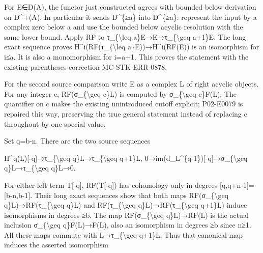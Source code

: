 \documentclass[11pt]{article}
\begin{document}
For E\allowbreak{}∈D(A)\allowbreak{},\allowbreak{} the functor just constructed agrees with bounded below derivation on D\textasciicircum{}\allowbreak{}+(A)\allowbreak{}. In particular it sends D\^{}\{≥a\} into D\textasciicircum{}\{≥a\}:\allowbreak{} represent the input by a complex zero below a and use the bounded below acyclic resolution with the same lower bound. Apply RF to τ\_\allowbreak{}\{\textbackslash{}leq a\}E\allowbreak{}→E\allowbreak{}→τ\_\allowbreak{}\{\textbackslash{}geq a\allowbreak{}+1\}E. The long exact sequence proves H\textasciicircum{}i(RF(τ\_\allowbreak{}\{\textbackslash{}leq a\}E)\allowbreak{})\allowbreak{}\allowbreak{}→H\textasciicircum{}i(RF(E)\allowbreak{})\allowbreak{} is an isomorphism for i≤a. It is also a monomorphism for i\allowbreak{}=a\allowbreak{}+1. This proves the statement with the existing parentheses correction MC-STK-ERR-0878.

For the second source comparison write E as a complex L of right acyclic objects. For any integer c,\allowbreak{} RF(σ\_\allowbreak{}\{\textbackslash{}geq c\}L)\allowbreak{} is computed by σ\_\allowbreak{}\{\textbackslash{}geq c\}F(L)\allowbreak{}. The quantifier on c makes the existing unintroduced cutoff explicit; P02-E0079 is repaired this way,\allowbreak{} preserving the true general statement instead of replacing c throughout by one special value.

Set q\allowbreak{}=b-n. There are the two source sequences

H\textasciicircum{}q(L)\allowbreak{}[-q]\allowbreak{}\allowbreak{}→τ\_\allowbreak{}\{\textbackslash{}geq q\}L\allowbreak{}→τ\_\allowbreak{}\{\textbackslash{}geq q\allowbreak{}+1\}L,\allowbreak{} 0\allowbreak{}→im(d\_\allowbreak{}L\textasciicircum{}\{q-1\})\allowbreak{}[-q]\allowbreak{}\allowbreak{}→σ\_\allowbreak{}\{\textbackslash{}geq q\}L\allowbreak{}→τ\_\allowbreak{}\{\textbackslash{}geq q\}L\allowbreak{}→0.

For either left term T[-q]\allowbreak{},\allowbreak{} RF(T[-q]\allowbreak{})\allowbreak{} has cohomology only in degrees [q,\allowbreak{}q\allowbreak{}+n-1]\allowbreak{}\allowbreak{}=[b-n,\allowbreak{}b-1]\allowbreak{}. Their long exact sequences show that both maps RF(σ\_\allowbreak{}\{\textbackslash{}geq q\}L)\allowbreak{}\allowbreak{}→RF(τ\_\allowbreak{}\{\textbackslash{}geq q\}L)\allowbreak{} and RF(τ\_\allowbreak{}\{\textbackslash{}geq q\}L)\allowbreak{}\allowbreak{}→RF(τ\_\allowbreak{}\{\textbackslash{}geq q\allowbreak{}+1\}L)\allowbreak{} induce isomorphisms in degrees ≥b. The map RF(σ\_\allowbreak{}\{\textbackslash{}geq q\}L)\allowbreak{}\allowbreak{}→RF(L)\allowbreak{} is the actual inclusion σ\_\allowbreak{}\{\textbackslash{}geq q\}F(L)\allowbreak{}\allowbreak{}→F(L)\allowbreak{},\allowbreak{} also an isomorphism in degrees ≥b since n≥1. All these maps commute with L\allowbreak{}→τ\_\allowbreak{}\{\textbackslash{}geq q\allowbreak{}+1\}L. Thus that canonical map induces the asserted isomorphism
\end{document}
